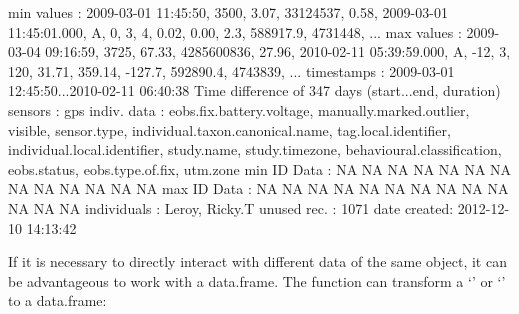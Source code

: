 \documentclass[article,nojss]{jss}
\newcommand{\fct}[1]{{\code{#1()}}}
\newcommand{\class}[1]{{`\code{#1}'}}
\begin{document}
\begin{Schunk}
\begin{Soutput}
min values  : 2009-03-01 11:45:50,                 3500,                              3.07,              33124537,                         0.58, 2009-03-01 11:45:01.000,           A,                0,                3,                         4,         0.02,    0.00,                    2.3,    588917.9,      4731448, ... 
max values  : 2009-03-04 09:16:59,                 3725,                             67.33,            4285600836,                        27.96, 2010-02-11 05:39:59.000,           A,              -12,                3,                       120,        31.71,  359.14,                 -127.7,    592890.4,      4743839, ... 
timestamps  : 2009-03-01 12:45:50...2010-02-11 06:40:38 Time difference of 347 days  (start...end, duration) 
sensors     : gps 
indiv. data : eobs.fix.battery.voltage, manually.marked.outlier, visible, sensor.type, individual.taxon.canonical.name, tag.local.identifier, individual.local.identifier, study.name, study.timezone, behavioural.classification, eobs.status, eobs.type.of.fix, utm.zone 
min ID Data : NA NA NA NA NA NA NA NA NA NA NA NA NA 
max ID Data : NA NA NA NA NA NA NA NA NA NA NA NA NA 
individuals : Leroy, Ricky.T 
unused rec. : 1071 
date created: 2012-12-10 14:13:42 
\end{Soutput}
\end{Schunk}

If it is necessary to directly interact with different data of the same object, it can be advantageous to work with a data.frame. The \fct{as} function can transform a \class{Move} or \class{MoveStack} to a data.frame:
\end{document}
